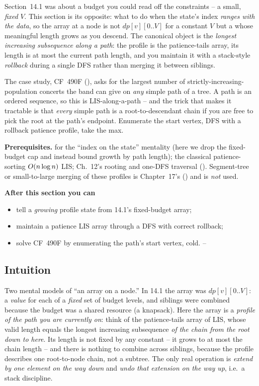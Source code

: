 \begin{topicintro}
Section~14.1 was about a budget you could read off the constraints -- a small,
\emph{fixed} $V$. This section is its opposite: what to do when the state's
index \emph{ranges with the data}, so the array at a node is not $\mathit{dp}[v][0..V]$
for a constant $V$ but a  whose meaningful length grows as you
descend. The canonical object is the \emph{longest increasing subsequence along
a path}: the profile is the patience-tails array, its length is at most the
current path length, and you maintain it with a stack-style \emph{rollback}
during a single DFS rather than merging it between siblings.

The case study, CF~490F (), asks for the largest
number of strictly-increasing-population concerts the band can give on \emph{any}
simple path of a tree. A path is an ordered sequence, so this is LIS-along-a-path --
and the trick that makes it tractable is that \emph{every} simple path is a
root-to-descendant chain if you are free to pick the root at the path's endpoint.
Enumerate the start vertex, DFS with a rollback patience profile, take the max.

\textbf{Prerequisites.}  for the ``index on the state''
mentality (here we drop the fixed-budget cap and instead bound growth by path
length); the classical patience-sorting $O(n\log n)$ LIS; Ch.~12's rooting
and one-DFS traversal (). Segment-tree or small-to-large
merging of these profiles is Chapter~17's () and is \emph{not} used.

\textbf{After this section you can}
\begin{itemize}[nosep]
  \item tell a \emph{growing} profile state from 14.1's fixed-budget array; \hfill{}
  \item maintain a patience LIS array through a DFS with correct rollback; \hfill{}
  \item solve CF~490F by enumerating the path's start vertex, cold. \hfill{}--
\end{itemize}
\end{topicintro}

\subsection{Intuition}

Two mental models of ``an array on a node.'' In 14.1 the array was
$\mathit{dp}[v][0..V]$: a \emph{value} for each of a \emph{fixed} set of budget
levels, and siblings were combined because the budget was a shared resource
(a knapsack). Here the array is a \emph{profile of the path you are currently on}:
think of the patience-tails array of LIS, whose valid length equals the longest
increasing subsequence \emph{of the chain from the root down to here}. Its length
is not fixed by any constant -- it grows to at most the chain length -- and there
is nothing to combine across siblings, because the profile describes one root-to-node
chain, not a subtree. The only real operation is \emph{extend by one element on the
way down} and \emph{undo that extension on the way up}, i.e.\ a stack discipline.

